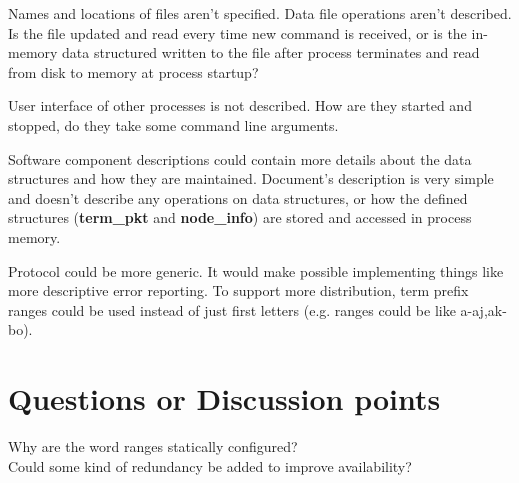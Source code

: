 \documentclass{article}
\begin{document}
Names and locations of files aren't specified. Data file operations aren't described. Is the file updated and read every time new command is received, or is the in-memory data structured written to the file after process terminates and read from disk to memory at process startup?

User interface of other processes is not described. How are they started and stopped, do they take some command line arguments.

Software component descriptions could contain more details about the data structures and how they are maintained. Document's description is very simple and doesn't describe any operations on data structures, or how the defined structures (\textbf{term\_pkt} and \textbf{node\_info}) are stored and accessed in process memory.

Protocol could be more generic. It would make possible implementing things like more descriptive error reporting. To support more distribution, term prefix ranges could be used instead of just first letters (e.g. ranges could be like a-aj,ak-bo).

\section{Questions or Discussion points}
Why are the word ranges statically configured?\\
Could some kind of redundancy be added to improve availability?
\end{document}
